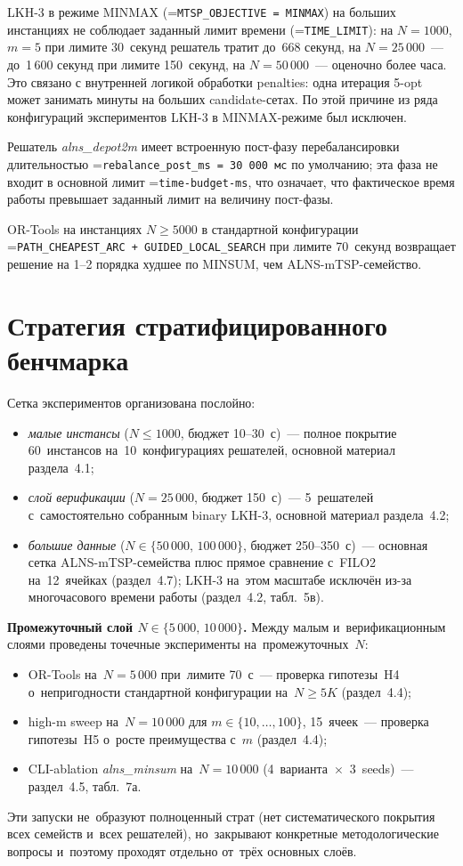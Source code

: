 \documentclass[a4paper,14pt]{extreport}
\makeatletter
\let\old@texttt\texttt
\renewcommand{\texttt}[1]{{\sloppy\hyphenchar\font=\m@ne\old@texttt{#1}}}
\makeatother
\begin{document}
LKH-3 в режиме MINMAX (\texttt{MTSP\_OBJECTIVE = MINMAX}) на больших инстанциях не соблюдает заданный лимит времени (\texttt{TIME\_LIMIT}): на $N = 1000$, $m = 5$ при лимите 30~секунд решатель тратит до~668 секунд, на $N = 25\,000$~--- до~1\,600 секунд при лимите 150~секунд, на $N = 50\,000$~--- оценочно более часа. Это связано с внутренней логикой обработки penalties: одна итерация 5-opt может занимать минуты на больших candidate-сетах. По этой причине из ряда конфигураций экспериментов LKH-3 в MINMAX-режиме был исключен.

Решатель \emph{alns\_depot2m} имеет встроенную пост-фазу перебалансировки длительностью \texttt{rebalance\_post\_ms = 30\,000~мс} по умолчанию; эта фаза не входит в основной лимит \texttt{time-budget-ms}, что означает, что фактическое время работы превышает заданный лимит на величину пост-фазы.

OR-Tools на инстанциях $N \geq 5000$ в стандартной конфигурации \texttt{PATH\_CHEAPEST\_ARC + GUIDED\_LOCAL\_SEARCH} при лимите 70~секунд возвращает решение на 1--2 порядка худшее по MINSUM, чем ALNS-mTSP-семейство.

\section{Стратегия стратифицированного бенчмарка}

Сетка экспериментов организована послойно:
\begin{itemize}\itemsep1pt
\item \emph{малые инстансы} ($N\leq 1000$, бюджет 10--30~с)~--- полное покрытие 60~инстансов на~10~конфигурациях решателей, основной материал раздела~4.1;
\item \emph{слой верификации} ($N=25\,000$, бюджет 150~с)~--- 5~решателей с~самостоятельно собранным binary LKH-3, основной материал раздела~4.2;
\item \emph{большие данные} ($N\in\{50\,000,\,100\,000\}$, бюджет 250--350~с)~--- основная сетка ALNS-mTSP-семейства плюс прямое сравнение с~FILO2 на~12~ячейках (раздел~4.7); LKH-3 на~этом масштабе исключён из-за многочасового времени работы (раздел~4.2, табл.~5в).
\end{itemize}

\noindent\textbf{Промежуточный слой $N\in\{5\,000,\,10\,000\}$.} Между малым и~верификационным слоями проведены точечные эксперименты на~промежуточных~$N$:
\begin{itemize}\itemsep1pt
\item OR-Tools на~$N=5\,000$ при~лимите 70~с~--- проверка гипотезы~H4 о~непригодности стандартной конфигурации на~$N\geq 5K$ (раздел~4.4);
\item high-m sweep на~$N=10\,000$ для $m\in\{10,\dots,100\}$, 15~ячеек~--- проверка гипотезы~H5 о~росте преимущества с~$m$ (раздел~4.4);
\item CLI-ablation \emph{alns\_minsum} на~$N=10\,000$ (4~варианта~$\times$~3~seeds)~--- раздел~4.5, табл.~7а.
\end{itemize}
Эти запуски не~образуют полноценный страт (нет систематического покрытия всех семейств и~всех решателей), но~закрывают конкретные методологические вопросы и~поэтому проходят отдельно от~трёх основных слоёв.
\end{document}
